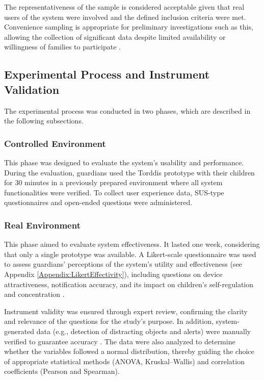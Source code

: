                 The representativeness of the sample is considered acceptable given that real users of the system were involved and the defined inclusion criteria were met. Convenience sampling is appropriate for preliminary investigations such as this, allowing the collection of significant data despite limited availability or willingness of families to participate \citep{DiPietro2025Meta}.
                
                \subsection{Experimental Process and Instrument Validation}
                The experimental process was conducted in two phases, which are described in the following subsections.
                
                \subsubsection{Controlled Environment}
                This phase was designed to evaluate the system’s usability and performance. During the evaluation, guardians used the Torddis prototype with their children for 30 minutes in a previously prepared environment where all system functionalities were verified. To collect user experience data, SUS-type questionnaires and open-ended questions were administered.
                
                \subsubsection{Real Environment}
                This phase aimed to evaluate system effectiveness. It lasted one week, considering that only a single prototype was available. A Likert-scale questionnaire was used to assess guardians' perceptions of the system’s utility and effectiveness (see Appendix \ref{Appendix:LikertEffectivity}), including questions on device attractiveness, notification accuracy, and its impact on children's self-regulation and concentration \citep{Ackermans2025Young}.
                
                Instrument validity was ensured through expert review, confirming the clarity and relevance of the questions for the study’s purpose. In addition, system-generated data (e.g., detection of distracting objects and alerts) were manually verified to guarantee accuracy \citep{Wang2025Development}. The data were also analyzed to determine whether the variables followed a normal distribution, thereby guiding the choice of appropriate statistical methods (ANOVA, Kruskal–Wallis) and correlation coefficients (Pearson and Spearman).
                
